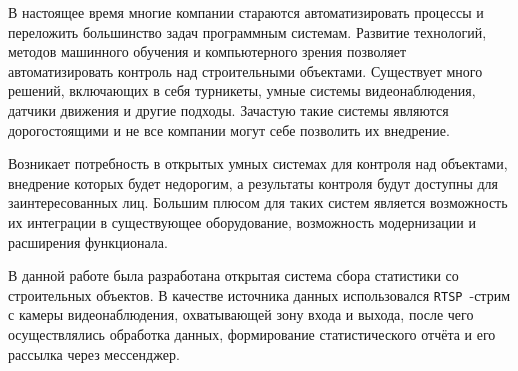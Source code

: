 В настоящее время многие компании стараются автоматизировать процессы и переложить большинство задач программным системам.
Развитие технологий, методов машинного обучения и компьютерного зрения позволяет автоматизировать контроль над строительными объектами.
Существует много решений, включающих в себя турникеты, умные системы видеонаблюдения, датчики движения и другие подходы.
Зачастую такие системы являются дорогостоящими и не все компании могут себе позволить их внедрение.

Возникает потребность в открытых умных системах для контроля над объектами, внедрение которых будет недорогим,
а результаты контроля будут доступны для заинтересованных лиц.
Большим плюсом для таких систем является возможность их интеграции в существующее оборудование,
возможность модернизации и расширения функционала.

В данной работе была разработана открытая система сбора статистики со строительных объектов.
В качестве источника данных использовался \texttt{RTSP}~\cite{rfc2326}-стрим с камеры видеонаблюдения, охватывающей зону входа и выхода,
после чего осуществлялись обработка данных, формирование статистического отчёта и его рассылка через мессенджер.
